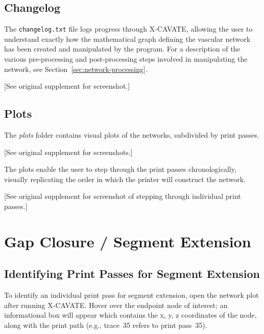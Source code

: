\documentclass[11pt,letterpaper]{article}
\newcommand{\code}[1]{\texttt{#1}}
\begin{document}
\subsection{Changelog}

The \code{changelog.txt} file logs progress through X-CAVATE, allowing the
user to understand exactly how the mathematical graph defining the vascular
network has been created and manipulated by the program. For a description of
the various pre-processing and post-processing steps involved in manipulating
the network, see Section~\ref{sec:network-processing}.

[See original supplement for screenshot.]

\subsection{Plots}

The \textit{plots} folder contains visual plots of the networks, subdivided by
print passes.

[See original supplement for screenshots.]

The plots enable the user to step through the print passes chronologically,
visually replicating the order in which the printer will construct the network.

[See original supplement for screenshot of stepping through individual print passes.]

\section{Gap Closure / Segment Extension}
\label{sec:gap-closure}

\subsection{Identifying Print Passes for Segment Extension}

To identify an individual print pass for segment extension, open the network
plot after running X-CAVATE. Hover over the endpoint node of interest; an
informational box will appear which contains the x, y, z coordinates of the
node, along with the print path (e.g., trace~35 refers to print pass~35).
\end{document}
